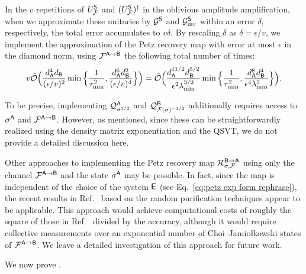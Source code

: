 In the $v$ repetitions of $U_{\mathcal{F}}^{\mathsf{S}}$ and $(U_{\mathcal{F}}^{\mathsf{S}})^\dag$ in the oblivious amplitude amplification, when we approximate these unitaries by ${\mathcal{G}}^{\mathsf{S}}$ and ${\mathcal{G}}_{\rm inv}^{\mathsf{S}}$ within an error $\delta$, respectively, the total error accumulates to $v\delta$.
By rescaling $\delta$ as $\delta = \epsilon/v$, we implement the approximation of the Petz recovery map with error at most $\epsilon$ in the diamond norm, using ${\mathcal{F}}^{{\mathsf{A}} \rightarrow {\mathsf{B}}}$ the following total number of times:
\begin{align}
\label{eq:sampcomp Petz}
    v\tilde{{\mathcal{O}}}\Big(\frac{d_{\mathsf{A}}^4 d_{\mathsf{B}}}{(\epsilon/v)^2 }\min\Big\{\frac{1}{\tau_{\rm min}^2}, \frac{d_{\mathsf{A}}^6d_{\mathsf{B}}^2}{(\epsilon/v)^4}\Big\}\Big) =\tilde{{\mathcal{O}}}\Big(\frac{d_{\mathsf{A}}^{11/2} d_{\mathsf{B}}^{5/2}}{\epsilon^2  \lambda_{\rm min}^{3/2}}\min\Big\{\frac{1}{\tau_{\rm min}^2}, \frac{d_{\mathsf{A}}^8 d_{\mathsf{B}}^4}{\epsilon^4\lambda_{\rm min}^2}\Big\}\Big).
\end{align}


To be precise, implementing ${\mathcal{Q}}_{\sigma^{1/2}}^{\mathsf{A}}$ and ${\mathcal{Q}}_{{\mathcal{F}}(\sigma)^{-1/2}}^{\mathsf{B}}$ additionally requires access to $\sigma^{\mathsf{A}}$ and ${\mathcal{F}}^{{\mathsf{A}}\rightarrow{\mathsf{B}}}$.
However, as mentioned, since these can be straightforwardly realized using the density matrix exponentiation and the QSVT, we do not provide a detailed discussion here.







Other approaches to implementing the Petz recovery map ${\mathcal{R}}_{\sigma, {\mathcal{F}}}^{{\mathsf{B}}\rightarrow{\mathsf{A}}}$ using only the channel ${\mathcal{F}}^{{\mathsf{A}}\rightarrow{\mathsf{B}}}$ and the state $\sigma^{\mathsf{A}}$ may be possible. 
In fact, since the map is independent of the choice of the system ${\mathsf{E}}$ (see Eq.~\eqref{eq:petz exp form rephrase}), the recent results in Ref.~\cite{tang2025conjugatequerieshelp} based on the random purification techniques appear to be applicable. 
This approach would achieve computational costs of roughly the square of those in Ref.~\cite{gilyen2022petzmap} divided by the accuracy, although it would require collective measurements over an exponential number of Choi--Jamio\l kowski states of ${\mathcal{F}}^{{\mathsf{A}}\rightarrow{\mathsf{B}}}$.
We leave a detailed investigation of this approach for future work.







We now prove .


